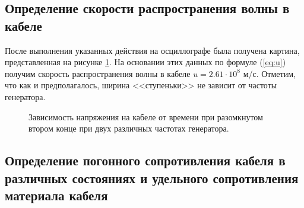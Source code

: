 \documentclass[a4paper, 12pt]{article}
\begin{document}
\subsection{Определение скорости распространения волны в кабеле}

После выполнения указанных действия на осциллографе была получена картина, представленная на рисунке \ref{fig:pt_2}. На основании этих данных по формуле (\ref{eq:u}) получим скорость распространения волны в кабеле $\boxed{u = 2.61 \cdot 10^8 }$ м/с. Отметим, что как и предполагалось, ширина <<ступеньки>> не зависит от частоты генератора.

\begin{figure}[H]
	\centering	
	\caption{Зависимость напряжения на кабеле от времени при разомкнутом втором конце при двух различных частотах генератора.}
	\label{fig:pt_2}
\end{figure}

\subsection{Определение погонного сопротивления кабеля в различных состояниях и удельного сопротивления материала кабеля}
\end{document}
